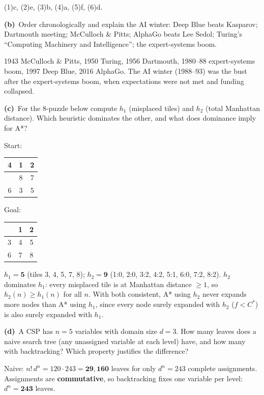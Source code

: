 \documentclass[11pt,a4paper]{article}
\renewcommand{\arraystretch}{1.25}
\newcommand{\subq}[1]{\par\smallskip\noindent\textbf{#1}\ }
\begin{document}
\begin{solbox}
(1)c, (2)e, (3)b, (4)a, (5)f, (6)d.
\end{solbox}
\subq{(b)}Order chronologically and explain the AI winter: Deep Blue beats Kasparov; Dartmouth meeting; McCulloch \& Pitts; AlphaGo beats Lee Sedol; Turing's ``Computing Machinery and Intelligence''; the expert-systems boom.
\begin{solbox}
1943 McCulloch \& Pitts, 1950 Turing, 1956 Dartmouth, 1980--88 expert-systems boom, 1997 Deep Blue, 2016 AlphaGo. The AI winter (1988--93) was the bust after the expert-systems boom, when expectations were not met and funding collapsed.
\end{solbox}
\subq{(c)}For the 8-puzzle below compute $h_1$ (misplaced tiles) and $h_2$ (total Manhattan distance). Which heuristic dominates the other, and what does dominance imply for A*?\par\begin{center}Start: {\renewcommand{\arraystretch}{1.3}\begin{tabular}{|c|c|c|}\hline 4 & 1 & 2 \\ \hline
 & 8 & 7 \\ \hline
6 & 3 & 5 \\ \hline\end{tabular}}\qquad Goal: {\renewcommand{\arraystretch}{1.3}\begin{tabular}{|c|c|c|}\hline  & 1 & 2 \\ \hline
3 & 4 & 5 \\ \hline
6 & 7 & 8 \\ \hline\end{tabular}}\end{center}
\begin{solbox}
$h_1=\mathbf{5}$ (tiles 3, 4, 5, 7, 8); $h_2=\mathbf{9}$ (1:0, 2:0, 3:2, 4:2, 5:1, 6:0, 7:2, 8:2). $h_2$ dominates $h_1$: every misplaced tile is at Manhattan distance $\ge1$, so $h_2(n)\ge h_1(n)$ for all $n$. With both consistent, A* using $h_2$ never expands more nodes than A* using $h_1$, since every node surely expanded with $h_2$ ($f<C^*$) is also surely expanded with $h_1$.
\end{solbox}
\subq{(d)}A CSP has $n=5$ variables with domain size $d=3$. How many leaves does a naive search tree (any unassigned variable at each level) have, and how many with backtracking? Which property justifies the difference?
\begin{solbox}
Naive: $n!\,d^n=120\cdot243=\mathbf{29{,}160}$ leaves for only $d^n=243$ complete assignments. Assignments are \textbf{commutative}, so backtracking fixes one variable per level: $d^n=\mathbf{243}$ leaves.
\end{solbox}
\end{document}
